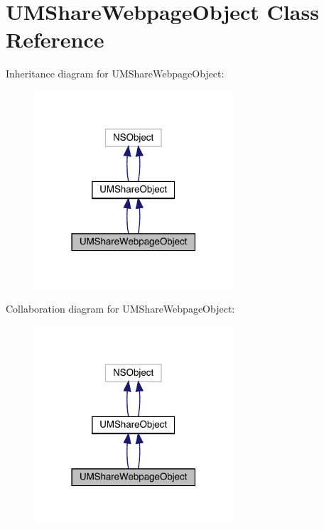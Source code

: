 \hypertarget{interface_u_m_share_webpage_object}{}\section{U\+M\+Share\+Webpage\+Object Class Reference}
\label{interface_u_m_share_webpage_object}


Inheritance diagram for U\+M\+Share\+Webpage\+Object\+:\nopagebreak
\begin{figure}[H]
\begin{center}
\leavevmode
\includegraphics[width=210pt]{interface_u_m_share_webpage_object__inherit__graph}
\end{center}
\end{figure}


Collaboration diagram for U\+M\+Share\+Webpage\+Object\+:\nopagebreak
\begin{figure}[H]
\begin{center}
\leavevmode
\includegraphics[width=210pt]{interface_u_m_share_webpage_object__coll__graph}
\end{center}
\end{figure}

